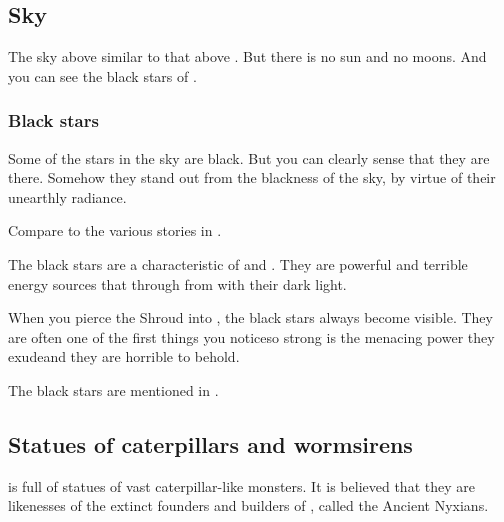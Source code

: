 \subsection{Sky}
The sky above \Nyx{} similar to that above \Azmith.
But there is no sun and no moons. 
And you can see the black stars of \Erebos. 





\subsubsection{Black stars}
Some of the stars in the \Nyxian{} sky are black. But you can clearly sense that they are there. Somehow they stand out from the blackness of the sky, by virtue of their unearthly radiance. 

Compare to the various stories in .


The black stars are a characteristic of \Nyx{} and \Erebos. They are powerful and terrible energy sources that  through from \Erebos{} with their dark light. 

When you pierce the Shroud into \Nyx, the black stars always become visible. They are often one of the first things you notice\dash so strong is the menacing power they exude\dash and they are horrible to behold. 

The black stars are mentioned in \emph{}. 







\subsection{Statues of caterpillars and wormsirens}
\Nyx is full of statues of vast caterpillar-like monsters. It is believed that they are likenesses of the extinct founders and builders of \Nyx, called the Ancient Nyxians. 

